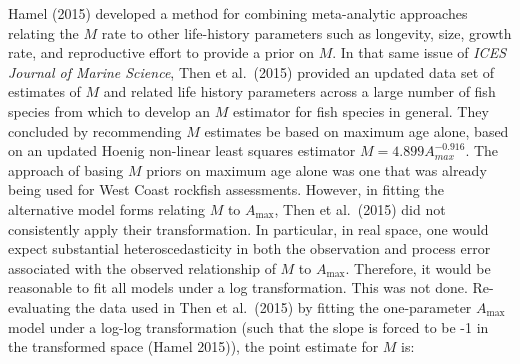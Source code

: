 \documentclass[11pt,
  english,
  a4paper,
]{article}
\begin{document}

Hamel {(2015)\leavevmode\tagmcend\tagstructend} developed a method for combining meta-analytic approaches relating the {\(M\)\leavevmode\tagmcend\tagstructend} rate to other life-history parameters such as longevity, size, growth rate, and reproductive effort to provide a prior on {\(M\)\leavevmode\tagmcend\tagstructend}. In that same issue of \emph{ICES Journal of Marine Science}, Then et al.~{(2015)\leavevmode\tagmcend\tagstructend} provided an updated data set of estimates of {\(M\)\leavevmode\tagmcend\tagstructend} and related life history parameters across a large number of fish species from which to develop an {\(M\)\leavevmode\tagmcend\tagstructend} estimator for fish species in general. They concluded by recommending {\(M\)\leavevmode\tagmcend\tagstructend} estimates be based on maximum age alone, based on an updated Hoenig non-linear least squares estimator {\(M = 4.899A^{-0.916}_{max}\)\leavevmode\tagmcend\tagstructend}. The approach of basing {\(M\)\leavevmode\tagmcend\tagstructend} priors on maximum age alone was one that was already being used for West Coast rockfish assessments. However, in fitting the alternative model forms relating {\(M\)\leavevmode\tagmcend\tagstructend} to {\(A_{\text{max}}\)\leavevmode\tagmcend\tagstructend}, Then et al.~{(2015)\leavevmode\tagmcend\tagstructend} did not consistently apply their transformation. In particular, in real space, one would expect substantial heteroscedasticity in both the observation and process error associated with the observed relationship of {\(M\)\leavevmode\tagmcend\tagstructend} to {\(A_{\text{max}}\)\leavevmode\tagmcend\tagstructend}. Therefore, it would be reasonable to fit all models under a log transformation. This was not done. Re-evaluating the data used in Then et al.~{(2015)\leavevmode\tagmcend\tagstructend} by fitting the one-parameter {\(A_{\text{max}}\)\leavevmode\tagmcend\tagstructend} model under a log-log transformation (such that the slope is forced to be -1 in the transformed space {(Hamel 2015)\leavevmode\tagmcend\tagstructend}), the point estimate for {\(M\)\leavevmode\tagmcend\tagstructend} is:
\end{document}

